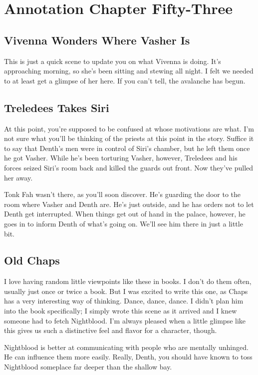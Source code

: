 \section{Annotation Chapter Fifty-Three}

\subsection*{Vivenna Wonders Where Vasher Is}

This is just a quick scene to update you on what Vivenna is doing. It’s approaching morning, so she’s been sitting and stewing all night. I felt we needed to at least get a glimpse of her here. If you can’t tell, the avalanche has begun.

\subsection*{Treledees Takes Siri}

At this point, you’re supposed to be confused at whose motivations are what. I’m not sure what you’ll be thinking of the priests at this point in the story. Suffice it to say that Denth’s men were in control of Siri’s chamber, but he left them once he got Vasher. While he’s been torturing Vasher, however, Treledees and his forces seized Siri’s room back and killed the guards out front. Now they’ve pulled her away.

Tonk Fah wasn’t there, as you’ll soon discover. He’s guarding the door to the room where Vasher and Denth are. He’s just outside, and he has orders not to let Denth get interrupted. When things get out of hand in the palace, however, he goes in to inform Denth of what’s going on. We’ll see him there in just a little bit.

\subsection*{Old Chaps}

I love having random little viewpoints like these in books. I don’t do them often, usually just once or twice a book. But I was excited to write this one, as Chaps has a very interesting way of thinking. Dance, dance, dance. I didn’t plan him into the book specifically; I simply wrote this scene as it arrived and I knew someone had to fetch Nightblood. I’m always pleased when a little glimpse like this gives us such a distinctive feel and flavor for a character, though.

Nightblood is better at communicating with people who are mentally unhinged. He can influence them more easily. Really, Denth, you should have known to toss Nightblood someplace far deeper than the shallow bay.

